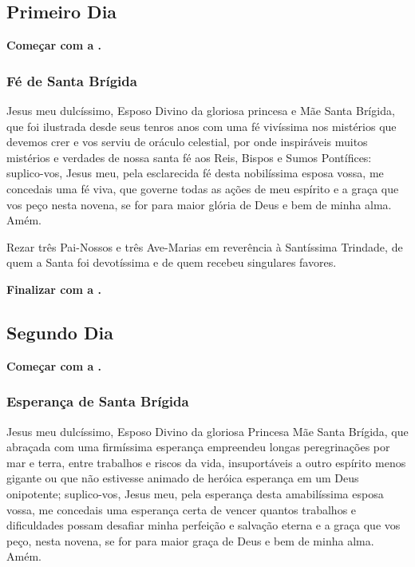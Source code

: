\documentclass[a4paper,12pt]{extarticle} \usepackage[utf8]{inputenc}
\begin{document}
\subsection{Primeiro Dia}

\noindent
\textbf{Começar com a .}

\subsubsection*{Fé de Santa Brígida}

Jesus meu dulcíssimo, Esposo Divino da gloriosa princesa e Mãe Santa Brígida, que foi ilustrada desde seus tenros anos com uma fé vivíssima nos mistérios que devemos crer e vos serviu de oráculo celestial, por onde inspiráveis muitos mistérios e verdades de nossa santa fé aos Reis, Bispos e Sumos Pontífices: suplico-vos, Jesus meu, pela esclarecida fé desta nobilíssima esposa vossa, me concedais uma fé viva, que governe todas as ações de meu espírito e a graça que vos peço nesta novena, se for para maior glória de Deus e bem de minha alma. Amém.

Rezar três Pai-Nossos e três Ave-Marias em reverência à Santíssima Trindade, de quem a Santa foi devotíssima e de quem recebeu singulares favores.

\noindent
\textbf{Finalizar com a .}


\subsection{Segundo Dia}

\noindent
\textbf{Começar com a .}

\subsubsection*{Esperança de Santa Brígida}

Jesus meu dulcíssimo, Esposo Divino da gloriosa Princesa Mãe Santa Brígida, que abraçada com uma firmíssima esperança empreendeu longas peregrinações por mar e terra, entre trabalhos e riscos da vida, insuportáveis a outro espírito menos gigante ou que não estivesse animado de heróica esperança em um Deus onipotente; suplico-vos, Jesus meu, pela esperança desta amabilíssima esposa vossa, me concedais uma esperança certa de vencer quantos trabalhos e dificuldades possam desafiar minha perfeição e salvação eterna e a graça que vos peço, nesta novena, se for para maior graça de Deus e bem de minha alma. Amém.
\end{document}
